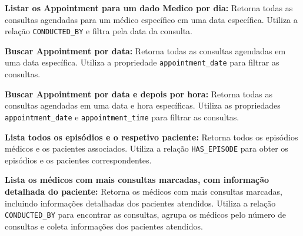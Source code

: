 \vspace{0.15cm}
\textbf{Listar os Appointment para um dado Medico por dia:} Retorna todas as consultas agendadas para um médico específico em uma data específica. Utiliza a relação \texttt{CONDUCTED\_BY} e filtra pela data da consulta.

\vspace{0.15cm}
\textbf{Buscar Appointment por data:} Retorna todas as consultas agendadas em uma data específica. Utiliza a propriedade \texttt{appointment\_date} para filtrar as consultas.

\vspace{0.15cm}
\textbf{Buscar Appointment por data e depois por hora:} Retorna todas as consultas agendadas em uma data e hora específicas. Utiliza as propriedades \texttt{appointment\_date} e \texttt{appointment\_time} para filtrar as consultas.

\vspace{0.15cm}
\textbf{Lista todos os episódios e o respetivo paciente:} Retorna todos os episódios médicos e os pacientes associados. Utiliza a relação \texttt{HAS\_EPISODE} para obter os episódios e os pacientes correspondentes.

\vspace{0.15cm}
\textbf{Lista os médicos com mais consultas marcadas, com informação detalhada do paciente:} Retorna os médicos com mais consultas marcadas, incluindo informações detalhadas dos pacientes atendidos. Utiliza a relação \texttt{CONDUCTED\_BY} para encontrar as consultas, agrupa os médicos pelo número de consultas e coleta informações dos pacientes atendidos.
